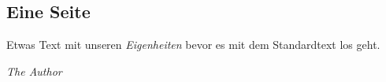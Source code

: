\documentclass{berg}
\begin{document}
\begin{multicols}{2}
\section{Eine Seite}
\large
\normalbaselines\linespread{0.92}\selectfont

Etwas Text mit unseren  \textit{\glqq Eigenheiten\grqq} bevor es mit dem Standardtext los geht.

\lipsum[1-5]

\textit{\normalsize The Author}
\bigskip

\end{multicols}
\end{document}
